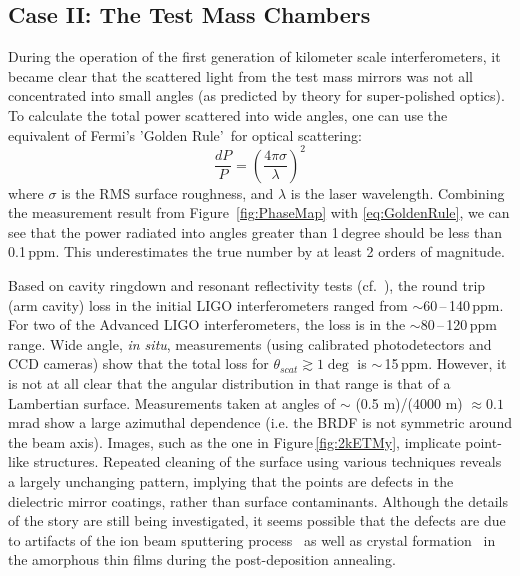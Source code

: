 \subsection{Case II: The Test Mass Chambers}
During the operation of the first generation of kilometer scale interferometers,
it became clear that the scattered light from the test mass mirrors was not
all concentrated into small angles (as predicted by theory for super-polished
optics). To calculate the total power scattered into wide angles, one can use the
equivalent of Fermi's 'Golden Rule'\,\cite{Weiss:Scatter97} for optical scattering:
\begin{equation}
\frac{dP}{P} = \left( \frac{4 \pi \sigma}{\lambda} \right)^2
\label{eq:GoldenRule}
\end{equation}
where $\sigma$ is the RMS surface roughness, and $\lambda$ is the
laser wavelength. Combining the measurement result from
Figure~\ref{fig:PhaseMap} with \eqref{eq:GoldenRule}, we can see that the power radiated into
angles greater than 1\,degree should be
less than 0.1\,ppm. This underestimates the true number by
at least 2 orders of magnitude.

Based on cavity ringdown and resonant reflectivity tests 
(cf.~\cite{Isogai2013}), the round trip (arm cavity) loss in the
 initial LIGO interferometers ranged from
$\sim$60\,--\,140\,ppm. For two of the Advanced LIGO interferometers, the loss
is in the $\sim$80\,--\,120\,ppm range. Wide angle, \textit{in situ},
measurements (using calibrated photodetectors and CCD cameras) show
that the total loss for $\theta_{scat} \gtrsim 1\deg$ is $\sim$\,15\,ppm.
However, it is not at all clear that the angular distribution in that
range is that of a Lambertian surface. Measurements taken at angles of
$\sim$ (0.5 m)/(4000 m) $\approx 0.1$\,mrad show a large azimuthal dependence
(i.e. the BRDF is not symmetric around the beam axis).
Images, such as the one in Figure\,\ref{fig:2kETMy}, 
implicate point-like structures.
Repeated cleaning of the surface using various techniques reveals a largely
unchanging pattern, implying that the points are defects in the dielectric
mirror coatings, rather than surface contaminants. Although the details of the
story are still being investigated, it seems possible that the defects
are due to artifacts of the ion beam sputtering process~\cite{reid2016development} as well as
crystal formation~\cite{Qin:ks} in the amorphous thin films during the
post-deposition annealing.

